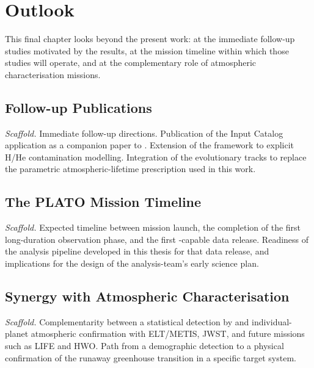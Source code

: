 \chapter{Outlook}
\label{chap:outlook}

This final chapter looks beyond the present work: at the immediate follow-up
studies motivated by the results, at the \PLATO mission timeline within which
those studies will operate, and at the complementary role of atmospheric
characterisation missions.


\section{Follow-up Publications}
\label{sec:follow_up}

\emph{Scaffold.}
Immediate follow-up directions. Publication of the \PLATO Input Catalog
application as a companion paper to \textcite{Schlecker2024}. Extension of
the framework to explicit H/He contamination modelling. Integration of the
\textcite{Aguichine2021} evolutionary tracks to replace the parametric
atmospheric-lifetime prescription used in this work.


\section{The PLATO Mission Timeline}
\label{sec:plato_timeline}

\emph{Scaffold.}
Expected timeline between mission launch, the completion of the first
long-duration observation phase, and the first \HZIED-capable data release.
Readiness of the analysis pipeline developed in this thesis for that data
release, and implications for the design of the analysis-team's early
science plan.


\section{Synergy with Atmospheric Characterisation}
\label{sec:synergy}

\emph{Scaffold.}
Complementarity between a statistical \HZIED detection by \PLATO and
individual-planet atmospheric confirmation with ELT/METIS, JWST, and future
missions such as LIFE and HWO. Path from a demographic detection to a
physical confirmation of the runaway greenhouse transition in a specific
target system.
